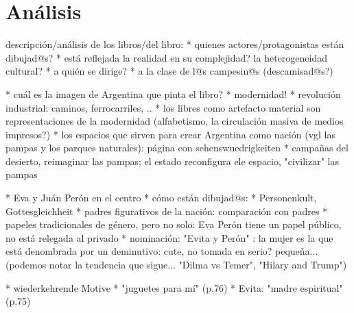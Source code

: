 \section{Análisis}

descripción/análisis de los libros/del libro:
* quienes actores/protagonistas están dibujad@s?
  * está reflejada la realidad en su complejidad? la heterogeneidad cultural?
* a quién se dirige?
  * a la clase de l@s campesin@s (descamisad@s?)

* cuál es la imagen de Argentina que pinta el libro?
  * modernidad!
    * revolución industrial: caminos, ferrocarriles, ..
    * los libres como artefacto material son representaciones de la modernidad (alfabetismo, la circulación masiva de medios impresos?)
  * los espacios que sirven para crear Argentina como nación (vgl las pampas y los parques naturales): página con sehenswuedrigkeiten
    * campañas del desierto, reimaginar las pampas; el estado reconfigura ele espacio, "civilizar" las pampas

* Eva y Juán Perón en el centro
  * cómo están dibujad@s:
    * Personenkult, Gottesgleichheit
    * padres figurativos de la nación: comparación con padres
    * papeles tradicionales de género, pero no solo: Eva Perón tiene un papel público, no está relegada al privado
  * nominación: "Evita y Perón" : la mujer es la que está denombrada por un deminutivo: cute, no tomada en serio? pequeña... (podemos notar la tendencia que sigue... "Dilma vs Temer", "Hilary and Trump")

* wiederkehrende Motive
  * "juguetes para mí" (p.76)
  * Evita: "madre espiritual" (p.75)
